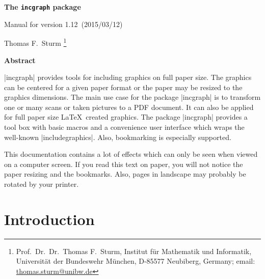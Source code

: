 \documentclass[a4paper,11pt]{ltxdoc}
\def\version{1.12}%
\def\datum{2015/03/12}%
\begin{document}
\begin{center}
\vspace*{5mm}
\begin{tcolorbox}[enhanced,
  center upper,width=10cm,boxrule=0.4pt,
  colback=white,colframe=black!50!yellow,drop fuzzy midday shadow=black!50!yellow]
{\bfseries\LARGE The \texttt{incgraph} package\par}\medskip
{\large Manual for version \version\ (\datum)\par}
\end{tcolorbox}\bigskip
{\large Thomas F.~Sturm%
  \footnote{Prof.~Dr.~Dr.~Thomas F.~Sturm, Institut f\"{u}r Mathematik und Informatik,
    Universit\"{a}t der Bundeswehr M\"{u}nchen, D-85577 Neubiberg, Germany;
     email: \href{mailto:thomas.sturm@unibw.de}{thomas.sturm@unibw.de}} }
\end{center}
\bigskip
\begin{absquote}
  \begin{center}\bfseries Abstract\end{center}
  |incgraph| provides tools for including graphics on full paper size.
  The graphics can be centered for a given paper format or the paper may be
  resized to the graphics dimensions.
  The main use case for the package |incgraph| is to transform one or many scans
  or taken pictures to a PDF document. It can also be applied for full paper size
  \LaTeX\ created graphics.
  The package |incgraph| provides a tool box with basic macros and a
  convenience user interface which wraps the well-known |includegraphics|.
  Also, bookmarking is especially supported.
\end{absquote}

\enlargethispage*{1cm}
\tableofcontents

\begin{inctext}[paper=graphics]
  \begin{tcolorbox}[title={Caveat\hfill --- Page \thepage\ ---},
    colframe=red!65!black,colback=red!10!white,fonttitle=\Large\bfseries,
    fontupper=\large,arc=0mm,outer arc=0mm]
    This documentation contains a lot of effects which can only be seen
    when viewed on a computer screen. If you read this text on paper, you
    will not notice the paper resizing and the bookmarks. Also, pages in landscape may probably
    be rotated by your printer.
  \end{tcolorbox}
\end{inctext}


\section{Introduction}
\end{document}

